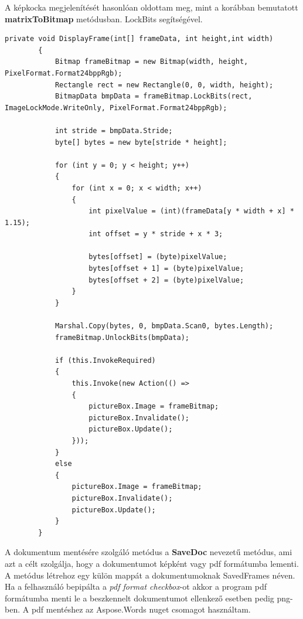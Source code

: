 \documentclass[]{thesis-ekf}
\theoremstyle{definition}
\theoremstyle{remark}
\begin{document}
	A képkocka megjelenítését hasonlóan oldottam meg, mint a korábban bemutatott \textbf{matrixToBitmap} metódusban. LockBits segítségével.
	\begin{lstlisting}[language=CSharp]
		private void DisplayFrame(int[] frameData, int height,int width)
		{
			Bitmap frameBitmap = new Bitmap(width, height, PixelFormat.Format24bppRgb);
			Rectangle rect = new Rectangle(0, 0, width, height);
			BitmapData bmpData = frameBitmap.LockBits(rect, ImageLockMode.WriteOnly, PixelFormat.Format24bppRgb);
			
			int stride = bmpData.Stride;
			byte[] bytes = new byte[stride * height];
			
			for (int y = 0; y < height; y++)
			{
				for (int x = 0; x < width; x++)
				{
					int pixelValue = (int)(frameData[y * width + x] * 1.15);
					int offset = y * stride + x * 3;
					
					bytes[offset] = (byte)pixelValue;         
					bytes[offset + 1] = (byte)pixelValue;     
					bytes[offset + 2] = (byte)pixelValue;     
				}
			}
			
			Marshal.Copy(bytes, 0, bmpData.Scan0, bytes.Length);
			frameBitmap.UnlockBits(bmpData);
			
			if (this.InvokeRequired)
			{
				this.Invoke(new Action(() =>
				{
					pictureBox.Image = frameBitmap;
					pictureBox.Invalidate();
					pictureBox.Update();
				}));
			}
			else
			{
				pictureBox.Image = frameBitmap;
				pictureBox.Invalidate();
				pictureBox.Update();
			}
		}	
	\end{lstlisting}
	A dokumentum mentésére szolgáló metódus a \textbf{SaveDoc} nevezetű metódus, ami azt a célt szolgálja, hogy a dokumentumot képként vagy pdf formátumba lementi. A metódus létrehoz egy külön mappát a dokumentumoknak SavedFrames néven. Ha a felhasználó bepipálta a \emph{pdf format checkbox}-ot akkor a program pdf formátumba menti le a beszkennelt dokumentumot ellenkező esetben pedig png-ben. A pdf mentéshez az Aspose.Words\cite{aspose.word} nuget csomagot használtam.
\end{document}
